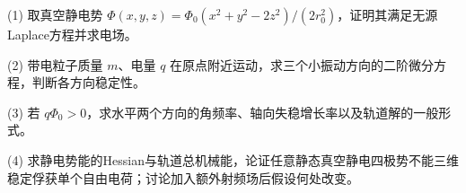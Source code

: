 (1) 取真空静电势 \(\Phi(x,y,z)=\Phi_0(x^2+y^2-2z^2)/(2r_0^2)\)，证明其满足无源Laplace方程并求电场。

(2) 带电粒子质量 \(m\)、电量 \(q\) 在原点附近运动，求三个小振动方向的二阶微分方程，判断各方向稳定性。

(3) 若 \(q\Phi_0>0\)，求水平两个方向的角频率、轴向失稳增长率以及轨道解的一般形式。

(4) 求静电势能的Hessian与轨道总机械能，论证任意静态真空静电四极势不能三维稳定俘获单个自由电荷；讨论加入额外射频场后假设何处改变。
